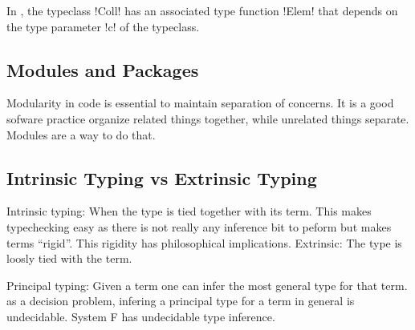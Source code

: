 \documentclass[manuscript,screen,nonacm]{acmart}
\begin{document}
In , the typeclass !Coll! has an associated type function !Elem! that depends on the type parameter !c! of the typeclass. 

\subsection{Modules and Packages}
Modularity in code is essential to maintain separation of concerns. It is a good sofware practice organize related things together, while unrelated things separate. Modules are a way to do that. 

\subsection{Intrinsic Typing vs Extrinsic Typing} %
Intrinsic typing: When the type is tied together with its term. This makes typechecking easy as there is not really any inference bit to peform but makes terms ``rigid''. This rigidity has philosophical implications.
Extrinsic: The type is loosly tied with the term.

Principal typing: Given a term one can infer the most general type for that term.
as a decision problem, infering a principal type for a term in general is undecidable.
System F has undecidable type inference\cite{wells_typability_1999}.
\end{document}
